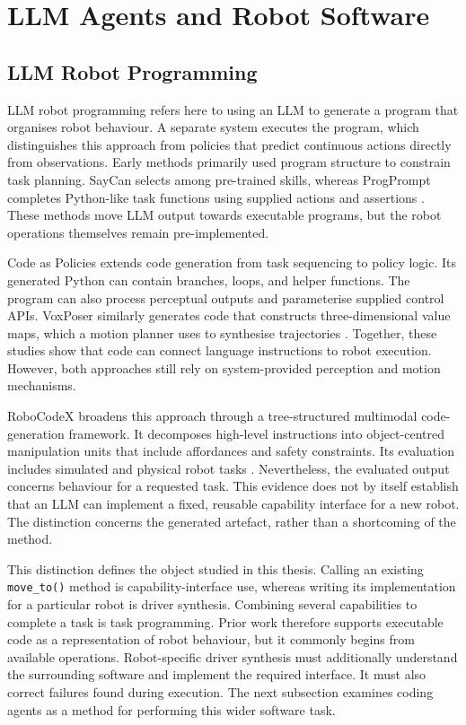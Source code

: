 \section{LLM Agents and Robot Software}
\label{sec:llm-agents-robot-software}

\subsection{LLM Robot Programming}
\label{sec:llm-robot-programming}

LLM robot programming refers here to using an LLM to generate a program that
organises robot behaviour. A separate system executes the program, which
distinguishes this approach from policies that predict continuous actions
directly from observations. Early methods primarily used program structure to
constrain task planning. SayCan selects among pre-trained skills, whereas
ProgPrompt completes Python-like task functions using supplied actions and
assertions \citep{ahn2022saycan,singh2023progprompt}. These methods move LLM
output towards executable programs, but the robot operations themselves remain
pre-implemented.

Code as Policies extends code generation from task sequencing to policy logic.
Its generated Python can contain branches, loops, and helper functions. The
program can also process perceptual outputs and parameterise supplied control
APIs. VoxPoser similarly generates code that constructs three-dimensional
value maps, which a motion planner uses to synthesise trajectories
\citep{liang2023codeaspolicies,huang2023voxposer}. Together, these studies show
that code can connect language instructions to robot execution. However, both
approaches still rely on system-provided perception and motion mechanisms.

RoboCodeX broadens this approach through a tree-structured multimodal
code-generation framework. It decomposes high-level instructions into
object-centred manipulation units that include affordances and safety
constraints. Its evaluation includes simulated and physical robot tasks
\citep{mu2024robocodex}. Nevertheless, the evaluated output concerns behaviour
for a requested task. This evidence does not by itself establish that an LLM
can implement a fixed, reusable capability interface for a new robot. The
distinction concerns the generated artefact, rather than a shortcoming of the
method.

This distinction defines the object studied in this thesis. Calling an
existing \texttt{move\_to()} method is capability-interface use, whereas
writing its implementation for a particular robot is driver synthesis.
Combining several capabilities to complete a task is task programming. Prior
work therefore supports executable code as a representation of robot
behaviour, but it commonly begins from available operations. Robot-specific
driver synthesis must additionally understand the surrounding software and
implement the required interface. It must also correct failures found during
execution. The next subsection examines coding agents as a method for
performing this wider software task.

